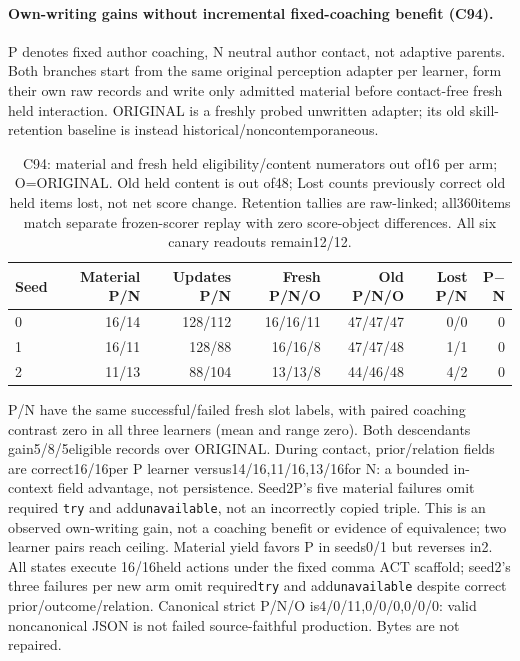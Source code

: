 \documentclass{article}
\begin{document}
\paragraph{Own-writing gains without incremental fixed-coaching benefit (C94).}
P denotes fixed author coaching, N neutral author contact, not adaptive parents.
Both branches start from the same original perception adapter per learner,
form their own raw records and write only admitted material before contact-free
fresh held interaction. ORIGINAL is a freshly probed unwritten adapter; its
old skill-retention baseline is instead historical/noncontemporaneous.
\begin{table}[htbp]
\centering\small
\begin{tabular}{lrrrrrr}
\toprule
Seed & Material P/N & Updates P/N & Fresh P/N/O & Old P/N/O & Lost P/N & P$-$N \\
\midrule
0 & 16/14 & 128/112 & 16/16/11 & 47/47/47 & 0/0 & 0 \\
1 & 16/11 & 128/88 & 16/16/8 & 47/47/48 & 1/1 & 0 \\
2 & 11/13 & 88/104 & 13/13/8 & 44/46/48 & 4/2 & 0 \\
\bottomrule
\end{tabular}
\caption{C94: material and fresh held eligibility/content numerators out of16
per arm; O=ORIGINAL. Old held content is out of48; Lost counts previously correct
old held items lost, not net score change. Retention tallies are raw-linked;
all360items match separate frozen-scorer replay with zero score-object differences.
All six canary readouts remain12/12.}
\label{tab:seq158-coaching}
\end{table}
P/N have the same successful/failed fresh slot labels, with paired coaching
contrast zero in all three learners (mean and range zero). Both descendants
gain5/8/5eligible records over ORIGINAL. During contact, prior/relation fields
are correct16/16per P learner versus14/16,11/16,13/16for N: a bounded in-context
field advantage, not persistence. Seed2P's five material failures omit required
\texttt{try} and add\texttt{unavailable}, not an incorrectly copied triple.
This is an observed own-writing gain,
not a coaching benefit or evidence of equivalence; two learner pairs reach
ceiling. Material yield favors P in seeds0/1 but reverses in2. All states execute
16/16held actions under the fixed comma ACT scaffold; seed2's three failures
per new arm omit required\texttt{try} and add\texttt{unavailable} despite correct
prior/outcome/relation. Canonical strict P/N/O is4/0/11,0/0/0,0/0/0: valid
noncanonical JSON is not failed source-faithful production. Bytes are not repaired.
\end{document}
